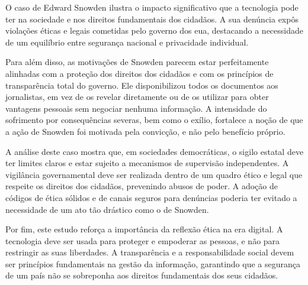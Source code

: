 \documentclass[a4paper,12pt]{article}
\begin{document}
O caso de Edward Snowden ilustra o impacto significativo que a tecnologia pode ter na sociedade e nos direitos fundamentais dos cidadãos. A sua denúncia expôs violações éticas e legais cometidas pelo governo dos \acrshort{eua}, destacando a necessidade de um equilíbrio entre segurança nacional e privacidade individual. 

Para além disso, as motivações de Snowden parecem estar perfeitamente alinhadas com a proteção dos direitos dos cidadãos e com os princípios de transparência total do governo. Ele disponibilizou todos os documentos aos jornalistas, em vez de os revelar diretamente ou de os utilizar para obter vantagens pessoais sem negociar nenhuma informação. A intensidade do sofrimento por consequências severas, bem como o exílio, fortalece a noção de que a ação de Snowden foi motivada pela convicção, e não pelo benefício próprio.

A análise deste caso mostra que, em sociedades democráticas, o sigilo estatal deve ter limites claros e estar sujeito a mecanismos de supervisão independentes. A vigilância governamental deve ser realizada dentro de um quadro ético e legal que respeite os direitos dos cidadãos, prevenindo abusos de poder. A adoção de códigos de ética sólidos e de canais seguros para denúncias poderia ter evitado a necessidade de um ato tão drástico como o de Snowden.

Por fim, este estudo reforça a importância da reflexão ética na era digital. A tecnologia deve ser usada para proteger e empoderar as pessoas, e não para restringir as suas liberdades. A transparência e a responsabilidade social devem ser princípios fundamentais na gestão da informação, garantindo que a segurança de um país não se sobreponha aos direitos fundamentais dos seus cidadãos.
\end{document}

